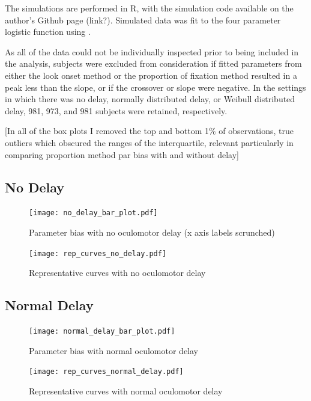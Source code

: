 The simulations are performed in R, with the simulation code available on the author's Github page (link?). Simulated data was fit to the four parameter logistic function using .

As all of the data could not be individually inspected prior to being included in the analysis, subjects were excluded from consideration if fitted parameters from either the look onset method or the proportion of fixation method resulted in a peak less than the slope, or if the crossover or slope were negative. In the settings in which there was no delay, normally distributed delay, or Weibull distributed delay, 981, 973, and 981 subjects were retained, respectively.

[In all of the box plots I removed the top and bottom 1\% of observations, true outliers which obscured the ranges of the interquartile, relevant particularly in comparing proportion method  par bias with and without delay]

\subsection{No Delay}


\begin{figure}[H]
\centering
\texttt{[image: no\_delay\_bar\_plot.pdf]}
\caption{Parameter bias with no oculomotor delay (x axis labels scrunched)}
\label{fig:par_bias_no_delay}
\end{figure}

\begin{figure}[H]
\centering
\texttt{[image: rep\_curves\_no\_delay.pdf]}
\caption{Representative curves with no oculomotor delay}
\label{fig:rep_curves_no_delay}
\end{figure}
%
%
%
\subsection{Normal Delay}

\begin{figure}[H]
\centering
\texttt{[image: normal\_delay\_bar\_plot.pdf]}
\caption{Parameter bias with normal oculomotor delay}
\label{fig:par_bias_normal_delay}
\end{figure}

\begin{figure}[H]
\centering
\texttt{[image: rep\_curves\_normal\_delay.pdf]}
\caption{Representative curves with normal oculomotor delay}
\label{fig:rep_curves_normal_delay}
\end{figure}

